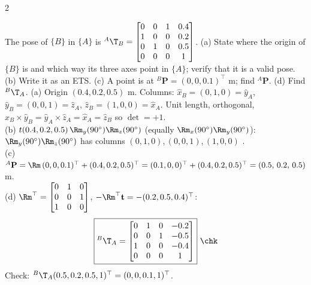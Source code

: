 \begin{multicols}{2}
\begin{examq}
The pose of $\{B\}$ in $\{A\}$ is ${}^A\T_B=\begin{bmatrix}0&0&1&0.4\\1&0&0&0.2\\0&1&0&0.5\\0&0&0&1\end{bmatrix}$. (a) State where the origin of $\{B\}$ is and which way its three axes point in $\{A\}$; verify that it is a valid pose. (b) Write it as an ETS. (c) A point is at ${}^B\mathbf P=(0,0,0.1)^\top$ m; find ${}^A\mathbf P$. (d) Find ${}^B\T_A$.
\solution
(a) Origin $(0.4,0.2,0.5)$ m. Columns: $\hat x_B=(0,1,0)=\hat y_A$, $\hat y_B=(0,0,1)=\hat z_A$, $\hat z_B=(1,0,0)=\hat x_A$. Unit length, orthogonal, $\hat x_B\times\hat y_B=\hat y_A\times\hat z_A=\hat x_A=\hat z_B$ so $\det=+1$.\\
(b) $t(0.4,0.2,0.5)\,\Rm_y(90^\circ)\Rm_z(90^\circ)$ (equally $\Rm_x(90^\circ)\Rm_y(90^\circ)$): $\Rm_y(90^\circ)\Rm_z(90^\circ)$ has columns $(0,1,0),(0,0,1),(1,0,0)$ \checkmark.\\
(c) ${}^A\mathbf P=\Rm\,(0,0,0.1)^\top+(0.4,0.2,0.5)^\top=(0.1,0,0)^\top+(0.4,0.2,0.5)^\top=(0.5,\,0.2,\,0.5)$ m.\\
(d) $\Rm^\top=\begin{bmatrix}0&1&0\\0&0&1\\1&0&0\end{bmatrix}$, $-\Rm^\top\mathbf t=-(0.2,0.5,0.4)^\top$:
\[\boxed{{}^B\T_A=\begin{bmatrix}0&1&0&-0.2\\0&0&1&-0.5\\1&0&0&-0.4\\0&0&0&1\end{bmatrix}}\ \chk\]
Check: ${}^B\T_A(0.5,0.2,0.5,1)^\top=(0,0,0.1,1)^\top$.
\end{examq}

\end{multicols}
